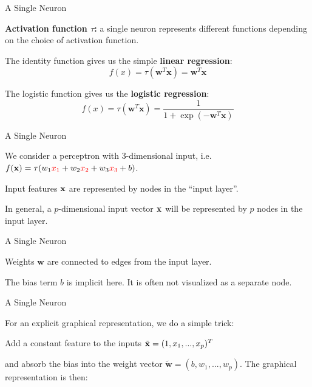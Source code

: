 \documentclass[11pt,compress,t,notes=noshow, xcolor=table]{beamer}
\begin{document}
\begin{framei}{A Single Neuron}
\item \textbf{Activation function $\tau$:} a single neuron %
 represents different functions %
 depending on the choice of activation function.
\item The identity function gives us the simple \textbf{linear regression}:
$$f(x) = \tau(\mathbf{w}^T \mathbf{x}) = \mathbf{w}^T \mathbf{x}$$
\item The logistic function gives us the \textbf{logistic regression}:
$$f(x) = \tau(\mathbf{w}^T \mathbf{x}) = \frac{1}{1 + \exp(-\mathbf{w}^T \mathbf{x})}$$
\end{framei}

\begin{framei} {A Single Neuron}
\item We consider a perceptron with $3$-dimensional input, i.e. $f(\mathbf{x}) = \tau(w_1\textcolor{red}{x_1} + w_2\textcolor{red}{x_2} + w_3\textcolor{red}{x_3} + b)$.
\item %
Input features $\mathbf{x}$ are represented by nodes in the \enquote{input layer}.
\item In general, a $p$-dimensional input vector $\mathbf{x}$ will be represented by $p$ nodes in the input layer.
\end{framei}

\begin{framei} {A Single Neuron}
\item Weights $\mathbf{w}$ are connected to edges from the input layer.
\item The bias term $b$ is implicit here. It is often not visualized as a separate node.
\end{framei}

\begin{framei} {A Single Neuron}
\item For an explicit graphical representation, we do a simple trick: 
\item Add a constant feature to the inputs $\tilde{\mathbf{x}} = (1, x_1, ..., x_p)^T$
\item and absorb the bias into the weight vector $\tilde{\bm{w}} = (b, w_1, ..., w_p)$.
The graphical representation is then: 
\end{framei}
\end{document}
